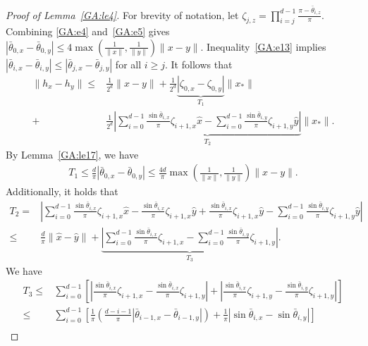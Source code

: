 \documentclass[11pt]{article}
\begin{document}
\begin{proof}[Proof of Lemma~\ref{GA:le4}]
For brevity of notation, let $\zeta_{j, z} = \prod_{i = j}^{d - 1} \frac{\pi - \bar{\theta}_{i, z}}{\pi}$.
Combining \eqref{GA:e4} and~\eqref{GA:e5} gives $|\bar{\theta}_{0, x} - \bar{\theta}_{0, y}| \leq 4 \max\left( \frac{1}{\|x\|}, \frac{1}{\|y\|} \right) \|x - y\|$.
Inequality~\eqref{GA:e13} implies
$|\bar{\theta}_{i, x} - \bar{\theta}_{i, y}| \leq |\bar{\theta}_{j, x} - \bar{\theta}_{j, y}|$ for all $i \geq j$.
It follows that
\begin{align}
\|h_{x} - h_{y}\| \leq& \frac{1}{2^d}\|x - y\| + \frac{1}{2^d} \underbrace{\left| \zeta_{0, x} - \zeta_{0, y} \right|}_{T_1} \|x_*\| \nonumber \\
+& \frac{1}{2^d} \underbrace{ \left| \sum_{i = 0}^{d - 1} \frac{\sin \bar{\theta}_{i, x}}{\pi} \zeta_{i + 1, x} \hat{x} - \sum_{i = 0}^{d - 1} \frac{\sin \bar{\theta}_{i, y}}{\pi} \zeta_{i + 1, y} \hat{y} \right| }_{T_2} \|x_*\|. \label{GA:e50}
\end{align}
By Lemma~\ref{GA:le17}, we have
\begin{align} \label{GA:e53}
T_1 \leq \frac{d}{\pi} |\bar{\theta}_{0, x} - \bar{\theta}_{0, y}| \leq \frac{4 d}{\pi}\max\left( \frac{1}{\|x\|}, \frac{1}{\|y\|} \right) \|x - y\|.
\end{align}
Additionally, it holds that
\begin{align}
T_2 =& \left| \sum_{i = 0}^{d - 1} \frac{\sin \bar{\theta}_{i, x}}{\pi} \zeta_{i + 1, x} \hat{x} - \frac{\sin \bar{\theta}_{i, x}}{\pi} \zeta_{i + 1, x} \hat{y} + \frac{\sin \bar{\theta}_{i, x}}{\pi} \zeta_{i + 1, x} \hat{y} - \sum_{i = 0}^{d - 1} \frac{\sin \bar{\theta}_{i, y}}{\pi} \zeta_{i + 1, y} \hat{y} \right| \nonumber \\
\leq& \frac{d}{\pi} \|\hat{x} - \hat{y}\| + \underbrace{ \left| \sum_{i = 0}^{d - 1} \frac{\sin \bar{\theta}_{i, x}}{\pi} \zeta_{i + 1, x} - \sum_{i = 0}^{d - 1} \frac{\sin \bar{\theta}_{i, y}}{\pi} \zeta_{i + 1, y} \right|}_{T_3} . \label{GA:e51}
\end{align}
We have
\begin{align}
T_3 \leq& \sum_{i = 0}^{d - 1} \left[ \left| \frac{\sin \bar{\theta}_{i, x}}{\pi} \zeta_{i + 1, x} -\frac{\sin \bar{\theta}_{i, x}}{\pi} \zeta_{i + 1, y} \right|\right. + \left.\left| \frac{\sin \bar{\theta}_{i, x}}{\pi} \zeta_{i + 1, y} - \frac{\sin \bar{\theta}_{i, y}}{\pi} \zeta_{i + 1, y} \right| \right] \nonumber \\
\leq& \sum_{i = 0}^{d - 1} \left[ \frac{1}{\pi} \left( \frac{d - i  - 1}{\pi} \left|\bar{\theta}_{i-1, x} - \bar{\theta}_{i-1, y}\right| \right) + \frac{1}{\pi} |\sin \bar{\theta}_{i, x} - \sin \bar{\theta}_{i, y}|  \right] \nonumber \\

\end{align}
\end{proof}
\end{document}
